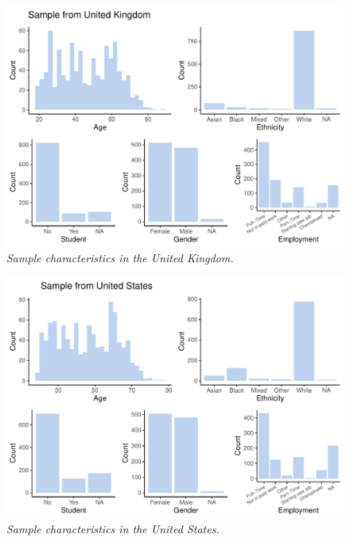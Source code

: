 \documentclass[
  english,
  man, donotrepeattitle,floatsintext]{apa6}
\begin{document}
\newpage



\begin{figure}
\centering
\includegraphics{manuscript_files/figure-latex/plotSampleUK-1.pdf}
\caption{\label{fig:plotSampleUK}\emph{Sample characteristics in the United Kingdom.}}
\end{figure}

\newpage



\begin{figure}
\centering
\includegraphics{manuscript_files/figure-latex/plotSampleUS-1.pdf}
\caption{\label{fig:plotSampleUS}\emph{Sample characteristics in the United States.}}
\end{figure}

\newpage
\end{document}
